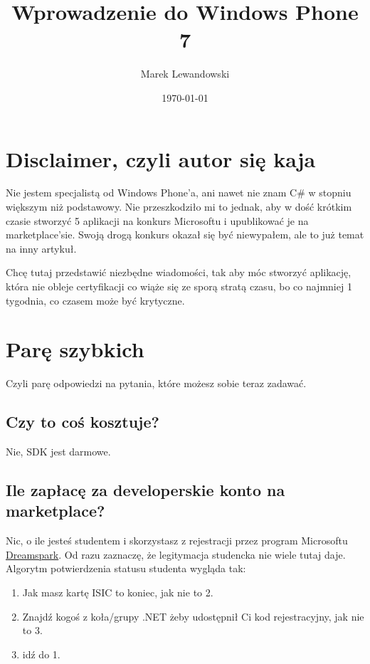 \documentclass[12pt, a4paper]{article}
\begin{document}
\title{Wprowadzenie do Windows Phone 7}
\author{Marek Lewandowski}
\date{\today}



\maketitle


\section{Disclaimer, czyli autor się kaja}
 Nie jestem specjalistą od Windows Phone'a, ani nawet nie znam C\# w stopniu
 większym niż podstawowy. Nie przeszkodziło mi to jednak, aby w dość krótkim czasie stworzyć 5 aplikacji na
konkurs Microsoftu i upublikować je na marketplace'sie. Swoją drogą konkurs
okazał się być niewypałem, ale to już temat na inny artykuł.

Chcę tutaj przedstawić niezbędne wiadomości, tak aby móc stworzyć aplikację,
która nie obleje certyfikacji co wiąże się ze sporą
stratą czasu, bo co najmniej 1 tygodnia, co czasem może być krytyczne.

\section{Parę szybkich}
Czyli parę odpowiedzi na pytania, które możesz sobie teraz zadawać.
\subsection{Czy to coś kosztuje?}
Nie, SDK jest darmowe.
\subsection{Ile zapłacę za developerskie konto na marketplace?}
Nic, o ile jesteś studentem i skorzystasz z rejestracji przez program Microsoftu
\href{https://www.dreamspark.com/}{Dreamspark}. Od razu zaznaczę, że legitymacja
studencka nie wiele tutaj daje. Algorytm potwierdzenia statusu studenta wygląda
tak:
\begin{enumerate}
  \item Jak masz kartę ISIC to koniec, jak nie to 2.
  \item Znajdź kogoś z koła/grupy .NET żeby udostępnił Ci kod rejestracyjny, jak
  nie to 3.
  \item idź do 1.
\end{enumerate}
\end{document}
